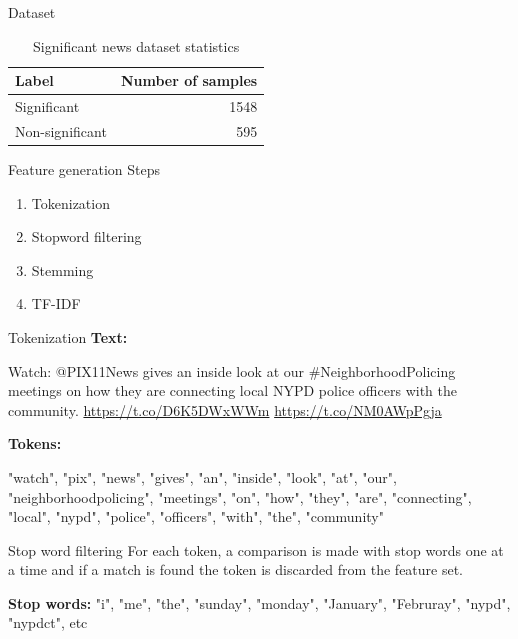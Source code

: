 \documentclass[12pt]{beamer}
\begin{document}
\begin{frame}{Dataset}
    \begin{table}[h]
    \begin{center}
    \begin{tabular}{lr}
    \toprule 
    Label&Number of samples\\
    \midrule 
    Significant&1548\\
    Non-significant&595\\
    \bottomrule
    \end{tabular}
    \caption{Significant news dataset statistics}
    \label{tbl:dataset_statistics}
    \end{center}
    \end{table}
\end{frame}

\begin{frame}{Feature generation}
    Steps
    \begin{enumerate}
        \item Tokenization
        \item Stopword filtering
        \item Stemming
        \item TF-IDF
    \end{enumerate}
\end{frame}

\begin{frame}{Tokenization}
    \textbf{Text:} \par
    Watch: @PIX11News  gives an inside look at our \#NeighborhoodPolicing
    meetings on how they are connecting local NYPD police officers with
    the community. \url{https://t.co/D6K5DWxWWm} \url{https://t.co/NM0AWpPgja}

    \textbf{Tokens:} \par
    "watch", "pix", "news", "gives", "an", "inside", "look", "at", "our", "neighborhoodpolicing", "meetings", "on", "how", "they", "are", "connecting", "local", "nypd", "police", "officers", "with", "the", "community"
\end{frame}

\begin{frame}{Stop word filtering}
    For each token, a comparison is made with stop words one at a time and if a match is found the token is discarded from the feature set.

    \textbf{Stop words:} "i", "me", "the", "sunday", "monday", "January", "Februray", "nypd", "nypdct", etc
\end{frame}
\end{document}
